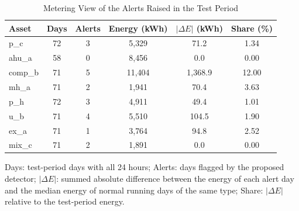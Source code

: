 \begin{table}[!t]
\caption{Metering View of the Alerts Raised in the Test Period}
\label{tab:metering}
\centering
\footnotesize
\setlength{\tabcolsep}{3pt}
\begin{tabular}{lccccc}
\toprule
\textbf{Asset} & \textbf{Days} & \textbf{Alerts} & \textbf{Energy (kWh)} & \textbf{$|\Delta E|$ (kWh)} & \textbf{Share (\%)} \\
\midrule
p\_c & 72 & 3 & 5{,}329 & 71.2 & 1.34 \\
ahu\_a & 58 & 0 & 8{,}456 & 0.0 & 0.00 \\
comp\_b & 71 & 5 & 11{,}404 & 1{,}368.9 & 12.00 \\
mh\_a & 71 & 2 & 1{,}941 & 70.4 & 3.63 \\
p\_h & 72 & 3 & 4{,}911 & 49.4 & 1.01 \\
u\_b & 71 & 4 & 5{,}510 & 104.5 & 1.90 \\
ex\_a & 71 & 1 & 3{,}764 & 94.8 & 2.52 \\
mix\_c & 71 & 2 & 1{,}891 & 0.0 & 0.00 \\
\bottomrule
\end{tabular}
\par\vspace{2pt}\begin{minipage}{0.97\columnwidth}\footnotesize Days: test-period days with all 24 hours; Alerts: days flagged by the proposed detector; $|\Delta E|$: summed absolute difference between the energy of each alert day and the median energy of normal running days of the same type; Share: $|\Delta E|$ relative to the test-period energy.\end{minipage}
\end{table}
